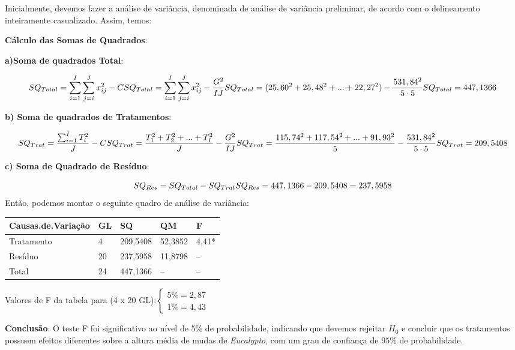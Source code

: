 \documentclass[
]{book}
\begin{document}
Inicialmente, devemos fazer a análise de variância, denominada de análise de variância preliminar, de acordo com o delineamento inteiramente casualizado. Assim, temos:

\textbf{Cálculo das Somas de Quadrados}:

\textbf{a)Soma de quadrados Total}:

\[
SQ_{Total} = \sum_{i=1}^I\sum_{j=i}^Jx_{ij}^2 - C \\
SQ_{Total} = \sum_{i=1}^I\sum_{j=i}^Jx_{ij}^2 - \frac{G^2}{IJ} \\
SQ_{Total} = (25,60^2+25,48^2+...+22,27^2) - \frac{531,84^2}{5\cdot5}\\
SQ_{Total} = 447,1366
\]

\textbf{b) Soma de quadrados de Tratamentos}:

\[
SQ_{Trat} = \frac{\sum_{i=1}^IT_i^2}{J} - C \\
SQ_{Trat} = \frac{T_1^2+T_2^2+...+T_I^2}{J} - \frac{G^2}{IJ}\\
SQ_{Trat} = \frac{115,74^2+117,54^2+...+91,93^2}{5} - \frac{531,84^2}{5\cdot5}\\ 
SQ_{Trat} = 209,5408
\]

\textbf{c) Soma de Quadrado de Resíduo}:

\[
SQ_{Res} = SQ_{Total} - SQ_{Trat} \\
SQ_{Res} = 447,1366- 209,5408 = 237,5958
\]
Então, podemos montar o seguinte quadro de análise de variância:

\begin{table}[H]
\centering
\begin{tabular}{l|l|l|l|l}
\hline
Causas.de.Variação & GL & SQ & QM & F\\
\hline
Tratamento & 4 & 209,5408 & 52,3852 & 4,41*\\
\hline
Resíduo & 20 & 237,5958 & 11,8798 & --\\
\hline
Total & 24 & 447,1366 & -- & --\\
\hline
\end{tabular}
\end{table}

Valores de F da tabela para (4 x 20 GL):\(\begin{cases} 5\%=2,87 \\ 1\%=4,43 \end{cases}\)

\textbf{Conclusão}: O teste F foi significativo ao nível de 5\% de probabilidade, indicando que devemos rejeitar \(H_0\) e concluir que os tratamentos possuem efeitos diferentes sobre a altura média de mudas de \emph{Eucalypto}, com um grau de confiança de \(95\%\) de probabilidade.
\end{document}
